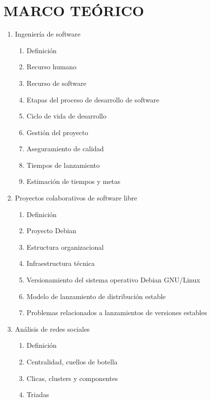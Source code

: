 \documentclass[12pt]{report}
\begin{document}
\chapter*{MARCO TEÓRICO}
\begin{enumerate}
\item Ingeniería de software
  \begin{enumerate}
  \item Definición
  \item Recurso humano
  \item Recurso de software
  \item Etapas del proceso de desarrollo de software
  \item Ciclo de vida de desarrollo
  \item Gestión del proyecto
  \item Aseguramiento de calidad    
  \item Tiempos de lanzamiento
  \item Estimación de tiempos y metas
  \end{enumerate}
\item Proyectos colaborativos de software libre
  \begin{enumerate}
  \item Definición
  \item Proyecto Debian
  \item Estructura organizacional
  \item Infraestructura técnica
  \item Versionamiento del sistema operativo Debian GNU/Linux
  \item Modelo de lanzamiento de distribución estable
  \item Problemas relacionados a lanzamientos de versiones estables
  \end{enumerate}
\item Análisis de redes sociales
  \begin{enumerate}
  \item Definición
  \item Centralidad, cuellos de botella
  \item Clicas, clusters y componentes
  \item Triadas
  \end{enumerate}
\end{enumerate}

\end{document}
